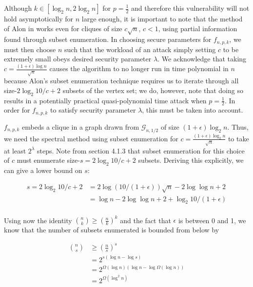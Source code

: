 \documentclass{article}
\theoremstyle{definition}
\begin{document}
Although $k \in [\log_2{n}, 2\log_2{n}]$ for $p=\frac{1}{2}$ and therefore 
this vulnerability will not hold asymptotically for $n$ large enough, it is important
to note that the method of Alon in \cite{Spectral} works even for cliques of size 
$c \sqrt{n}$, $c < 1$, using partial information found through subset enumeration.  
In choosing secure parameters for $f_{n,p,k}$, we must then choose $n$ such that 
the workload of an attack simply setting $c$ to be extremely small 
obeys desired security parameter $\lambda$.  We acknowledge 
that taking $c=\frac{(1+\epsilon)\log{n}}{\sqrt{n}}$ causes the algorithm to no 
longer run in time polynomial in $n$ because Alon's subset enumeration technique 
requires us to iterate through all size-$2\log_2{10/c}+2$ subsets of the vertex 
set; we do, however, note that doing so results in a potentially practical 
quasi-polynomial time attack when $p = \frac{1}{2}$.  In order for $f_{n,p,k}$ 
to satisfy security parameter $\lambda$, this must be taken into account.

$f_{n,p,k}$ embeds a clique in a graph drawn from $\mathcal{G}_{n,1/2}$
of size $(1+\epsilon) \log_2{n}$.  Thus, we need the spectral method using subset enumeration for $c=\frac{(1+\epsilon)\log_2{n}}{\sqrt{n}}$ to take at least $2^\lambda$ steps.  Note from 
section 4.1.3 that subset enumeration for this choice of $c$ must enumerate 
size-$s = 2\log_2{10/c}+2$ subsets.  Deriving this explicitly, we can give a lower bound 
on $s$:

\begin{align*}
s = 2\log_2{10/c}+2 &= 2\log{(10/(1+\epsilon)) \sqrt{n}} - 2\log{\log{n}} + 2 \\
& = \log{n} - 2\log\log{n} + 2 + \log_2{10/(1+\epsilon)} \\
\end{align*}

\noindent Using now the identity $\binom{n}{k} \geq (\frac{n}{k})^k$ and the 
fact that $\epsilon$ is between 0 and 1, we know that the number of subsets 
enumerated is bounded from below by

\begin{align*}
\binom{n}{s} & \geq (\frac{n}{s})^s \\
&= 2^{s(\log{n} - \log{s})} \\
&= 2^{\Omega(\log{n})(\log{n}-\log{\Omega(\log{n})})} \\
&= 2^{\Omega(\log^2{n})}
\end{align*}
\end{document}
